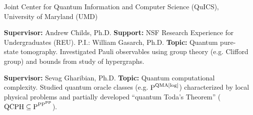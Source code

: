 \documentclass[11pt,letterpaper,serif]{moderncv}
\begin{document}
{
	$\!$\begin{minipage}{0.8\textwidth}
		Joint Center for Quantum Information and Computer Science (QuICS), \newline
		University of Maryland (UMD)	
	\end{minipage}
}
{}{}
{	
	\begin{adjustwidth}{.25in}{}
		\textbf{Supervisor:} Andrew Childs, Ph.D. \newline
		\textbf{Support:} NSF Research Experience for Undergraduates (REU). P.I.: William Gasarch, Ph.D. \newline
		\textbf{Topic:} Quantum pure-state tomography. Investigated Pauli observables using group theory (e.g. Clifford group) and bounds from study of hypergraphs.
	\end{adjustwidth}
}

{
	\begin{adjustwidth}{.25in}{}
		\textbf{Supervisor:} Sevag Gharibian, Ph.D. \newline
		\textbf{Topic:} Quantum computational complexity. Studied quantum oracle classes  (e.g. \href{https://complexityzoo.uwaterloo.ca/Complexity_Zoo:P\#pqmalog}{\scriptsize $\textup{P}^{\textup{QMA[log]}}$}) characterized by local physical problems and partially developed ``quantum Toda's Theorem'' ({\scriptsize $\textup{QCPH}\subseteq \textup{P}^{\textup{PP}^{\textup{PP}}}$}).
	\end{adjustwidth}
}

\printbibliography[heading=subbibliography, title={Preprints}, keyword=preprint]

\printbibliography[heading=subbibliography, title={Conference Presentations}, keyword=resume_conference]




\end{document}
